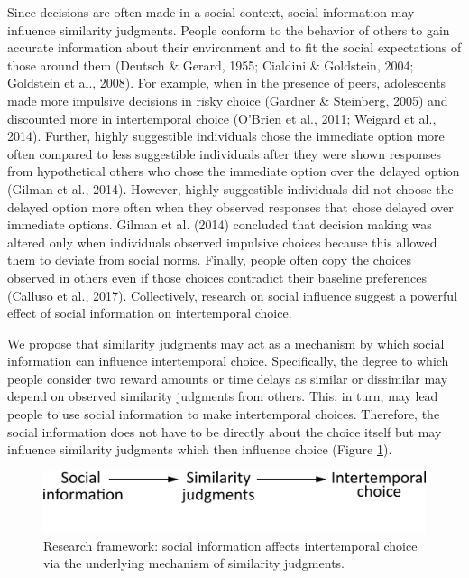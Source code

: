 \documentclass[
  pub,floatsintext]{apa6}
\begin{document}
Since decisions are often made in a social context, social information may influence similarity judgments. People conform to the behavior of others to gain accurate information about their environment and to fit the social expectations of those around them (Deutsch \& Gerard, 1955; Cialdini \& Goldstein, 2004; Goldstein et al., 2008). For example, when in the presence of peers, adolescents made more impulsive decisions in risky choice (Gardner \& Steinberg, 2005) and discounted more in intertemporal choice (O'Brien et al., 2011; Weigard et al., 2014). Further, highly suggestible individuals chose the immediate option more often compared to less suggestible individuals after they were shown responses from hypothetical others who chose the immediate option over the delayed option (Gilman et al., 2014). However, highly suggestible individuals did not choose the delayed option more often when they observed responses that chose delayed over immediate options. Gilman et al. (2014) concluded that decision making was altered only when individuals observed impulsive choices because this allowed them to deviate from social norms. Finally, people often copy the choices observed in others even if those choices contradict their baseline preferences (Calluso et al., 2017). Collectively, research on social influence suggest a powerful effect of social information on intertemporal choice.

We propose that similarity judgments may act as a mechanism by which social information can influence intertemporal choice. Specifically, the degree to which people consider two reward amounts or time delays as similar or dissimilar may depend on observed similarity judgments from others. This, in turn, may lead people to use social information to make intertemporal choices. Therefore, the social information does not have to be directly about the choice itself but may influence similarity judgments which then influence choice (Figure \ref{fig:researchframework}).



\begin{figure}

{\centering \includegraphics[width=1\linewidth]{figures/research_framework} 

}

\caption{Research framework: social information affects intertemporal choice via the underlying mechanism of similarity judgments.}\label{fig:researchframework}
\end{figure}
\end{document}
